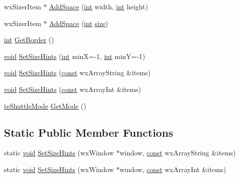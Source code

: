\begin{DoxyCompactItemize}
wx\+Sizer\+Item $\ast$ \hyperlink{class_shuttle_gui_a3a5b4056473e3a9f240a8e9b173424fe}{Add\+Space} (\hyperlink{xmltok_8h_a5a0d4a5641ce434f1d23533f2b2e6653}{int} width, \hyperlink{xmltok_8h_a5a0d4a5641ce434f1d23533f2b2e6653}{int} height)
\item 
wx\+Sizer\+Item $\ast$ \hyperlink{class_shuttle_gui_acca1e8ba237f7a94bb6023ecb93d0490}{Add\+Space} (\hyperlink{xmltok_8h_a5a0d4a5641ce434f1d23533f2b2e6653}{int} \hyperlink{group__lavu__mem_ga854352f53b148adc24983a58a1866d66}{size})
\item 
\hyperlink{xmltok_8h_a5a0d4a5641ce434f1d23533f2b2e6653}{int} \hyperlink{class_shuttle_gui_a485e74610e07e37d0b45ff509444725e}{Get\+Border} ()
\item 
\hyperlink{sound_8c_ae35f5844602719cf66324f4de2a658b3}{void} \hyperlink{class_shuttle_gui_a80bb6fc1ac47561ff1716904fb73041c}{Set\+Size\+Hints} (\hyperlink{xmltok_8h_a5a0d4a5641ce434f1d23533f2b2e6653}{int} minX=-\/1, \hyperlink{xmltok_8h_a5a0d4a5641ce434f1d23533f2b2e6653}{int} minY=-\/1)
\item 
\hyperlink{sound_8c_ae35f5844602719cf66324f4de2a658b3}{void} \hyperlink{class_shuttle_gui_ad89fed8b75f735fd000088997f25f029}{Set\+Size\+Hints} (\hyperlink{getopt1_8c_a2c212835823e3c54a8ab6d95c652660e}{const} wx\+Array\+String \&items)
\item 
\hyperlink{sound_8c_ae35f5844602719cf66324f4de2a658b3}{void} \hyperlink{class_shuttle_gui_ab119a7212533c3023c9ef644278333ee}{Set\+Size\+Hints} (\hyperlink{getopt1_8c_a2c212835823e3c54a8ab6d95c652660e}{const} wx\+Array\+Int \&items)
\item 
\hyperlink{_shuttle_gui_8h_a0c8bf96cca5e5b020b22818e8490b964}{te\+Shuttle\+Mode} \hyperlink{class_shuttle_gui_a158ad598e42f0cb9c2e24adedfa97379}{Get\+Mode} ()
\end{DoxyCompactItemize}
\subsection*{Static Public Member Functions}
\begin{DoxyCompactItemize}
\item 
static \hyperlink{sound_8c_ae35f5844602719cf66324f4de2a658b3}{void} \hyperlink{class_shuttle_gui_af760f3f0d445a8eb58c6ee07933dda50}{Set\+Size\+Hints} (wx\+Window $\ast$window, \hyperlink{getopt1_8c_a2c212835823e3c54a8ab6d95c652660e}{const} wx\+Array\+String \&items)
\item 
static \hyperlink{sound_8c_ae35f5844602719cf66324f4de2a658b3}{void} \hyperlink{class_shuttle_gui_af03306ab68675e25d7b2095c8409c3fd}{Set\+Size\+Hints} (wx\+Window $\ast$window, \hyperlink{getopt1_8c_a2c212835823e3c54a8ab6d95c652660e}{const} wx\+Array\+Int \&items)
\end{DoxyCompactItemize}
